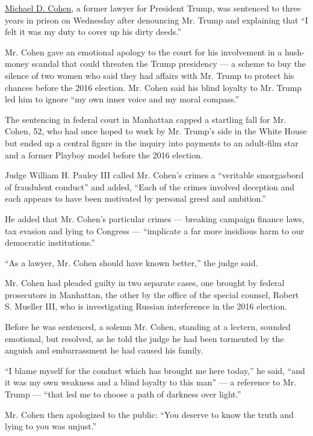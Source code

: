 \href{https://www.nytimes3xbfgragh.onion/2020/07/21/nyregion/michael-cohen-trump-book.html}{Michael
D. Cohen}, a former lawyer for President Trump, was sentenced to three
years in prison on Wednesday after denouncing Mr. Trump and explaining
that ``I felt it was my duty to cover up his dirty deeds.''

Mr. Cohen gave an emotional apology to the court for his involvement in
a hush-money scandal that could threaten the Trump presidency --- a
scheme to buy the silence of two women who said they had affairs with
Mr. Trump to protect his chances before the 2016 election. Mr. Cohen
said his blind loyalty to Mr. Trump led him to ignore ``my own inner
voice and my moral compass.''

The sentencing in federal court in Manhattan capped a startling fall for
Mr. Cohen, 52, who had once hoped to work by Mr. Trump's side in the
White House but ended up a central figure in the inquiry into payments
to an adult-film star and a former Playboy model before the 2016
election.

Judge William H. Pauley III called Mr. Cohen's crimes a ``veritable
smorgasbord of fraudulent conduct'' and added, ``Each of the crimes
involved deception and each appears to have been motivated by personal
greed and ambition.''

He added that Mr. Cohen's particular crimes --- breaking campaign
finance laws, tax evasion and lying to Congress --- ``implicate a far
more insidious harm to our democratic institutions.''

``As a lawyer, Mr. Cohen should have known better,'' the judge said.

Mr. Cohen had pleaded guilty in two separate cases, one brought by
federal prosecutors in Manhattan, the other by the office of the special
counsel, Robert S. Mueller III, who is investigating Russian
interference in the 2016 election.

Before he was sentenced, a solemn Mr. Cohen, standing at a lectern,
sounded emotional, but resolved, as he told the judge he had been
tormented by the anguish and embarrassment he had caused his family.

``I blame myself for the conduct which has brought me here today,'' he
said, ``and it was my own weakness and a blind loyalty to this man'' ---
a reference to Mr. Trump --- ``that led me to choose a path of darkness
over light.''

Mr. Cohen then apologized to the public: ``You deserve to know the truth
and lying to you was unjust.''


